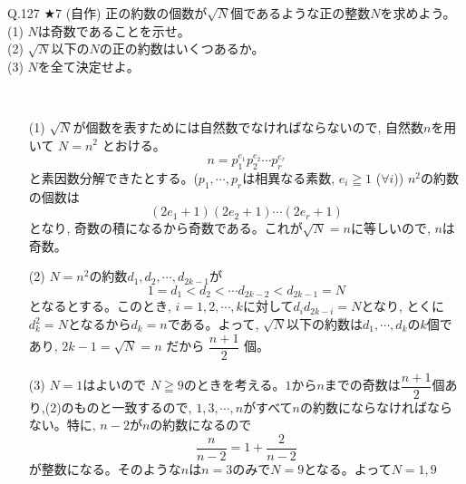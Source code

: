 \documentclass[twocolumn]{jsarticle}
\newcommand{\thm}{\begin{itembox}[l]}
\newcommand{\enthm}{\end{itembox}\\}
\renewcommand{\geq}{\geqq}
\newcommand{\hosi}{$\bigstar$}
\begin{document}
\thm{Q.127 \hosi 7 (自作)}
正の約数の個数が$\sqrt{N}$個であるような正の整数$N$を求めよう。\\
(1) $N$は奇数であることを示せ。\\
(2) $\sqrt{N}$以下の$N$の正の約数はいくつあるか。\\
(3) $N$を全て決定せよ。
\enthm
\begin{enumerate}
\item[(1)] $\sqrt{N}$が個数を表すためには自然数でなければならないので,  自然数$n$を用いて $N=n^2$ とおける。
\[n=p_1^{e_1}p_2^{e_2}\cdots p_r^{e_r}\]
と素因数分解できたとする。($p_1, \cdots, p_r$は相異なる素数, $e_i\geq 1$ ($\forall i$)) $n^2$の約数の個数は
\[(2e_1+1)(2e_2+1)\cdots (2e_r +1)\]
となり, 奇数の積になるから奇数である。これが$\sqrt{N}=n$に等しいので, $n$は奇数。
\item[(2)] $N=n^2$の約数$d_1,d_2,\cdots, d_{2k-1}$が
\[1=d_1<d_2<\cdots d_{2k-2}<d_{2k-1}=N\]
となるとする。このとき, $i=1,2,\cdots ,k$に対して$d_id_{2k-i}=N$となり, とくに$d_k^2=N$となるから$d_k=n$である。よって, $\sqrt{N}$以下の約数は$d_1,\cdots, d_k$の$k$個であり, $2k-1=\sqrt{N}=n$ だから $\dfrac{n+1}{2}$ 個。
\item[(3)] $N=1$はよいので $N\geq 9$のときを考える。$1$から$n$までの奇数は$\dfrac{n+1}{2}$個あり,(2)のものと一致するので, $1,3,\cdots, n$がすべて$n$の約数にならなければならない。特に, $n-2$が$n$の約数になるので
\[\dfrac{n}{n-2}=1+\dfrac{2}{n-2}\]
が整数になる。そのような$n$は$n=3$のみで$N=9$となる。よって$N=1,9$
\end{enumerate}
\end{document}
